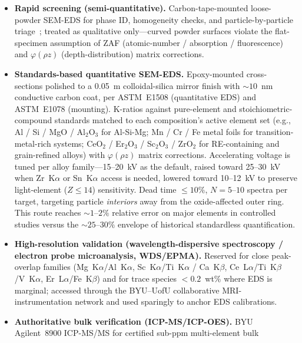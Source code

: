 \documentclass[11pt,letterpaper]{article}
\begin{document}
\begin{itemize}[leftmargin=*,nosep]
  \item \textbf{Rapid screening (semi-quantitative).} Carbon-tape-mounted
        loose-powder SEM-EDS for phase ID, homogeneity checks, and
        particle-by-particle triage~\cite{groarke_2021_b9780128}; treated as
        qualitative only---curved powder surfaces violate the flat-specimen
        assumption of ZAF (atomic-number / absorption / fluorescence) and
        $\varphi(\rho z)$ (depth-distribution) matrix corrections.
  \item \textbf{Standards-based quantitative SEM-EDS.} Epoxy-mounted cross-
        sections polished to a 0.05~\textmu{}m colloidal-silica mirror finish
        with ${\sim}10$~nm conductive carbon coat, per ASTM~E1508 (quantitative
        EDS) and ASTM~E1078 (mounting).  K-ratios against pure-element and
        stoichiometric-compound standards matched to each composition's
        active element set (e.g., Al / Si / MgO / Al$_2$O$_3$ for Al-Si-Mg;
        Mn / Cr / Fe metal foils for transition-metal-rich systems; CeO$_2$
        / Er$_2$O$_3$ / Sc$_2$O$_3$ / ZrO$_2$ for RE-containing and
        grain-refined alloys) with $\varphi(\rho z)$ matrix corrections.
        Accelerating voltage is tuned per alloy family---15--20~kV as the
        default, raised toward 25--30~kV when Zr~K$\alpha$ or Sn~K$\alpha$
        access is needed, lowered toward 10--12~kV to preserve light-element
        ($Z{\leq}14$) sensitivity.  Dead time $\leq 10\%$, $N=5$--$10$
        spectra per target, targeting particle \emph{interiors} away from
        the oxide-affected outer ring.  This route reaches ${\sim}1$--$2\%$
        relative error on major elements in controlled studies versus the
        ${\sim}25$--$30\%$ envelope of his\-tor\-i\-cal standardless
        quantification.
  \item \textbf{High-resolution validation (wavelength-dispersive
        spectroscopy / electron probe microanalysis, WDS/EPMA).} Reserved
        for close peak-overlap families (Mg~K$\alpha$/Al~K$\alpha$, Sc~K$\alpha$/Ti~K$\alpha$
        / Ca~K$\beta$, Ce~L$\alpha$/Ti~K$\beta$/V~K$\alpha$,
        Er~L$\alpha$/Fe~K$\beta$) and for trace species $<0.2$~wt\% where
        EDS is marginal; accessed through the BYU--UofU collaborative
        MRI-in\-stru\-men\-ta\-tion network and used sparingly to anchor
        EDS calibrations.
  \item \textbf{Authoritative bulk verification (ICP-MS/ICP-OES).} BYU
        Agilent~8900 ICP-MS/MS for certified sub-ppm multi-element bulk

\end{itemize}
\end{document}
